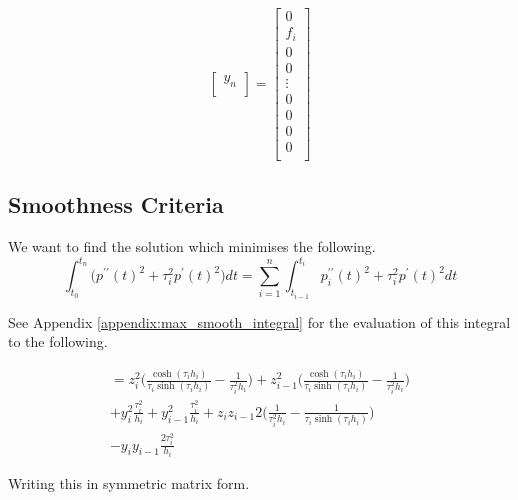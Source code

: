 \documentclass{article}
\begin{document}
\begin{equation*}
\begin{bmatrix}
        y_n \\
    \end{bmatrix} =
    \begin{bmatrix}
        0 \\
        f_i \\
        0 \\
        0 \\
        \vdots \\
        0 \\
        0 \\
        0 \\
        0 \\
    \end{bmatrix}
\end{equation*}

\subsection{Smoothness Criteria}
We want to find the solution which minimises the following.
\begin{equation}
    \int_{t_0}^{t_n} \bigl( p^{\prime\prime}(t)^2 + \tau_i^2 p^{\prime}(t)^2 \bigr) dt = 
    \sum_{i=1}^{n}\int_{t_{i - 1}}^{t_i}p^{\prime\prime}_i(t)^2 + \tau_i^2 p^{\prime}(t)^2 dt
\end{equation}

See Appendix \ref{appendix:max_smooth_integral} for the evaluation of this integral to the
following.

\begin{multline}
    = z_i^2 \biggl( \frac{\cosh(\tau_i h_i)}{\tau_i \sinh(\tau_i h_i)} -
    \frac{1}{\tau_i^2 h_i} \biggr) 
    + z_{i-1}^2 \biggl( \frac{\cosh(\tau_i h_i)}{\tau_i \sinh(\tau_i h_i)} -
    \frac{1}{\tau_i^2 h_i} \biggr) \\
    + y_i^2 \frac{\tau_i^2}{h_i} + y_{i-1}^2 \frac{\tau_i^2}{h_i} 
    + z_i z_{i-1} 2 \biggl( \frac{1}{\tau_i^2 h_i} - \frac{1}{\tau_i \sinh(\tau_i h_i)} \biggr) \\
    - y_i y_{i-1} \frac{2 \tau_i^2}{h_i}
\end{multline}

Writing this in symmetric matrix form.
\end{document}

